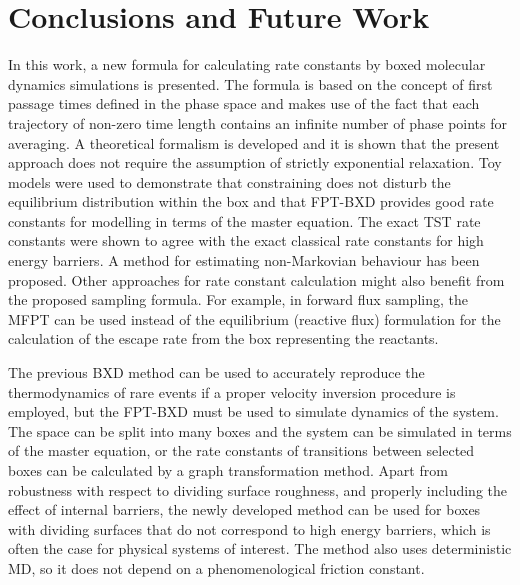 \chapter{Conclusions and Future Work}

In this work, a new formula for calculating rate constants by boxed molecular dynamics simulations is presented.
The formula is based on the concept of first passage times defined in the phase space and makes use of the fact that each trajectory of non-zero time length contains an infinite number of phase points for averaging.
A theoretical formalism is developed and it is shown that the present approach does not require the assumption of strictly exponential relaxation.
Toy models were used to demonstrate that constraining does not disturb the equilibrium distribution within the box and that FPT-BXD provides good rate constants for modelling in terms of the master equation.
The exact TST rate constants were shown to agree with the exact classical rate constants for high energy barriers.
A method for estimating non-Markovian behaviour has been proposed.
Other approaches for rate constant calculation might also benefit from the proposed sampling formula. 
For example, in forward flux sampling,\cite{Allen2009, Kratzer2013} the MFPT can be used instead of the equilibrium (reactive flux) formulation for the calculation of the escape rate from the box representing the reactants.

The previous BXD method\cite{Glowacki2009} can be used to accurately reproduce the thermodynamics of rare events if a proper velocity inversion procedure is employed, but the FPT-BXD must be used to simulate dynamics of the system.
The space can be split into many boxes and the system can be simulated in terms of the master equation, or the rate constants of transitions between selected boxes can be calculated by a graph transformation method.\cite{Wales2009}
Apart from robustness with respect to dividing surface roughness, and properly including the effect of internal barriers, the newly developed method can be used for boxes with dividing surfaces that do not correspond to high energy barriers, which is often the case for physical systems of interest.
The method also uses deterministic MD, so it does not depend on a phenomenological friction constant.

